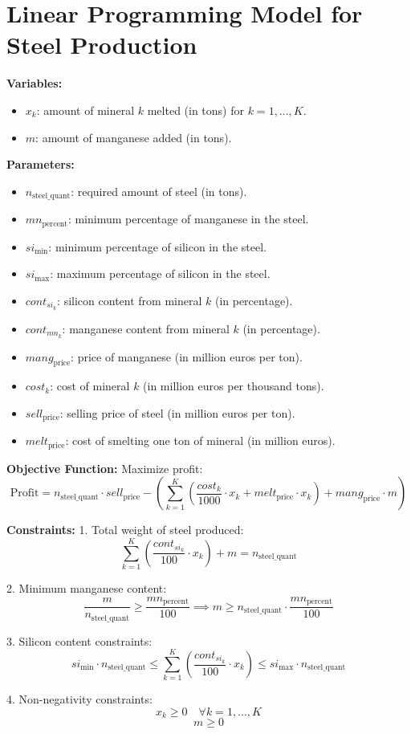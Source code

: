 \documentclass{article}
\begin{document}
\section*{Linear Programming Model for Steel Production}

\textbf{Variables:}
\begin{itemize}
    \item $x_k$: amount of mineral $k$ melted (in tons) for $k = 1, \ldots, K$.
    \item $m$: amount of manganese added (in tons).
\end{itemize}

\textbf{Parameters:}
\begin{itemize}
    \item $n_{\text{steel\_quant}}$: required amount of steel (in tons).
    \item $mn_{\text{percent}}$: minimum percentage of manganese in the steel.
    \item $si_{\text{min}}$: minimum percentage of silicon in the steel.
    \item $si_{\text{max}}$: maximum percentage of silicon in the steel.
    \item $cont_{si_k}$: silicon content from mineral $k$ (in percentage).
    \item $cont_{mn_k}$: manganese content from mineral $k$ (in percentage).
    \item $mang_{\text{price}}$: price of manganese (in million euros per ton).
    \item $cost_k$: cost of mineral $k$ (in million euros per thousand tons).
    \item $sell_{\text{price}}$: selling price of steel (in million euros per ton).
    \item $melt_{\text{price}}$: cost of smelting one ton of mineral (in million euros).
\end{itemize}

\textbf{Objective Function:}
Maximize profit:
\[
\text{Profit} = n_{\text{steel\_quant}} \cdot sell_{\text{price}} - \left( \sum_{k=1}^{K} \left(\frac{cost_k}{1000} \cdot x_k + melt_{\text{price}} \cdot x_k\right) + mang_{\text{price}} \cdot m \right)
\]

\textbf{Constraints:}
1. Total weight of steel produced:
\[
\sum_{k=1}^{K} \left( \frac{cont_{si_k}}{100} \cdot x_k \right) + m = n_{\text{steel\_quant}}
\]

2. Minimum manganese content:
\[
\frac{m}{n_{\text{steel\_quant}}} \geq \frac{mn_{\text{percent}}}{100} \implies m \geq n_{\text{steel\_quant}} \cdot \frac{mn_{\text{percent}}}{100}
\]

3. Silicon content constraints:
\[
si_{\text{min}} \cdot n_{\text{steel\_quant}} \leq \sum_{k=1}^{K} \left( \frac{cont_{si_k}}{100} \cdot x_k \right) \leq si_{\text{max}} \cdot n_{\text{steel\_quant}}
\]

4. Non-negativity constraints:
\[
x_k \geq 0 \quad \forall k = 1, \ldots, K
\]
\[
m \geq 0
\]
\end{document}
